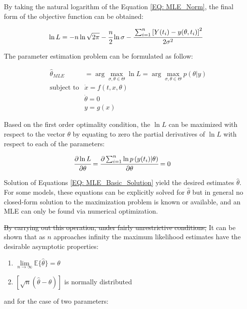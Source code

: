 \documentclass[a4paper,fleqn]{cas-dc}
\begin{document}
By taking the natural logarithm of the Equation \ref{EQ: MLE_Norm}, the final form of the objective function can be obtained:

{\footnotesize
	\begin{equation}
		\ln L = -n \ln \sqrt{2 \pi} - \cfrac{n}{2} \ln \sigma
		- \cfrac{ \sum_{i=1}^{n} \left[  Y(t_i) - y(\theta , t_i) \right]^2 }{2 \sigma^2}
	\end{equation}
}

The parameter estimation problem can be formulated as follow:

{\footnotesize
	\begin{equation}
		\begin{aligned}
			&\hat{\theta}_{MLE} &= \arg \max_{\sigma, \theta \in \Theta} \ln L = \arg \max_{\sigma,\theta \in \Theta} p(\theta|y) \\
			&\text{subject to}
			& \dot{x} = f(t,x,\theta) \\
			&& \dot{\theta} = 0 \\
			&& y = g(x)
		\end{aligned}
\end{equation} }

{\color{red}Based on the first order optimality condition,} the $\ln L$ can be maximized with respect to the vector $\theta$ by equating to zero the partial derivatives of $\ln L$ with respect to each of the parameters:

{\footnotesize
	\begin{align}\label{EQ: MLE_Basic_Solution}
		\cfrac{\partial \ln L}{\partial \theta} &= \cfrac{\partial \sum_{i=1}^{n} \ln p\left( y(t_i) | \theta \right) }{\partial \theta} = 0 
\end{align} }

Solution of Equations \ref{EQ: MLE_Basic_Solution} yield the desired estimates $\hat{\theta}$. For some models, these equations can be explicitly solved for $\hat{\theta}$ but in general no closed-form solution to the maximization problem is known or available, and an MLE can only be found via numerical optimization.

\sout{By carrying out this operation, under fairly unrestrictive conditions,} 
It can be shown that as $n$ approaches infinity the maximum likelihood estimates have the desirable asymptotic properties:

\begin{enumerate}[label=(\arabic*)]
	\item {\footnotesize $\lim\limits_{n \rightarrow \infty} \mathbb{E}\{\hat{\theta}\} = \theta$ }
	\item {\footnotesize $\left[ \sqrt{n}\left( \hat{\theta} - \theta \right) \right]$ } is normally distributed
\end{enumerate}
and for the case of two parameters:
\end{document}
